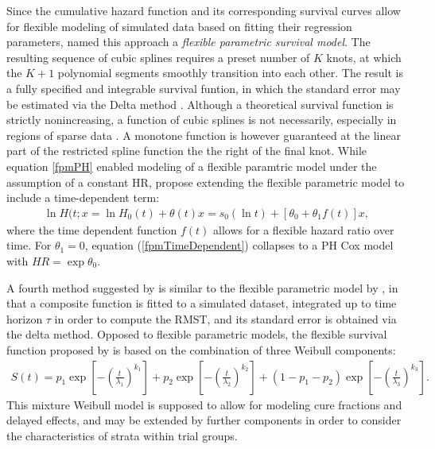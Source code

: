 \documentclass[main.tex]{subfiles}
\begin{document}
Since the cumulative hazard function and its corresponding survival curves allow for flexible modeling of simulated data based on fitting their regression parameters, \textcite{Royston2002-ud} named this approach a  \textit{flexible parametric survival model}. The resulting sequence of cubic splines requires a preset number of $K$ knots, at which the $K+1$ polynomial segments smoothly transition into each other. The result is a fully specified and integrable survival funtion, in which the standard error may be estimated via the Delta method \parencite{Royston2002-ud}. Although a theoretical survival function is strictly nonincreasing, a function of cubic splines is not necessarily, especially in regions of sparse data \parencite{Royston2002-ud}. A monotone function is however guaranteed at the linear part of the restricted spline function the the right of the final knot.
While equation \ref{fpmPH} enabled modeling of a flexible paramtric model under the assumption of a constant HR, \textcite{royston2014approach} propose extending the flexible parametric model to include a time-dependent term:
\begin{align}\label{fpmTimeDependent}
\ln{H(t; x} = \ln{H_0(t)} + \theta(t)x = s_0(\ln{t}) + [\theta_0 + \theta_1 f(t)]x,
\end{align}
where the time dependent function $f(t)$ allows for a flexible hazard ratio over time. For $\theta_1 = 0$, equation (\ref{fpmTimeDependent}) collapses to a PH Cox model with $HR = \exp{\theta_0}$.

A fourth method suggested by \textcite{Liao2020-gn} is similar to the flexible parametric model by \textcite{Royston2002-ud}, in that a composite function is fitted to a simulated dataset, integrated up to time horizon $\tau$ in order to compute the RMST, and its standard error is obtained via the delta method. Opposed to flexible parametric models, the flexible survival function proposed by \textcite{Liao2020-gn} is based on the combination of three Weibull components:
\begin{align}
S(t)=
p_1\exp{\left[-\left(\frac{t}{\lambda_1}\right)^{k_1}\right]}
+
p_2\exp{\left[-\left(\frac{t}{\lambda_2}\right)^{k_2}\right]}
+(1-p_1-p_2)
\exp{\left[-\left(\frac{t}{\lambda_3}\right)^{k_3}\right]}.
\end{align}
This mixture Weibull model is supposed to allow for modeling cure fractions and delayed effects, and may be extended by further components in order to consider the characteristics of strata within trial groups.
\end{document}
